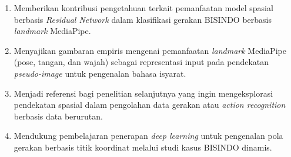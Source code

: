 \begin{enumerate}[noitemsep]
    \item Memberikan kontribusi pengetahuan terkait pemanfaatan model spasial berbasis \textit{Residual Network} dalam klasifikasi gerakan BISINDO berbasis \textit{landmark} MediaPipe.
    \item Menyajikan gambaran empiris mengenai pemanfaatan \textit{landmark} MediaPipe (pose, tangan, dan wajah) sebagai representasi input pada pendekatan \textit{pseudo-image} untuk pengenalan bahasa isyarat.
    \item Menjadi referensi bagi penelitian selanjutnya yang ingin mengeksplorasi pendekatan spasial dalam pengolahan data gerakan atau \textit{action recognition} berbasis data berurutan.
    \item Mendukung pembelajaran penerapan \textit{deep learning} untuk pengenalan pola gerakan berbasis titik koordinat melalui studi kasus BISINDO dinamis.
\end{enumerate} \par
